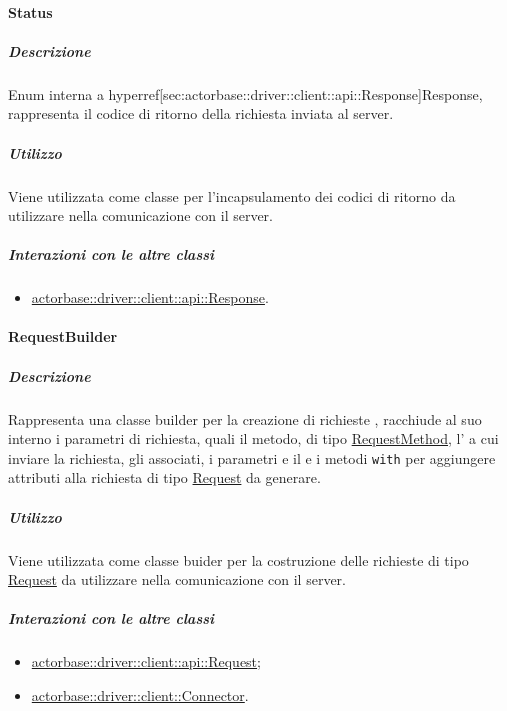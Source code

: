 \documentclass{scalatekids-article}
\begin{document}
\paragraph{Status}
\label{sec:actorbase::driver::client::api::Status}

\subparagraph{Descrizione}

Enum interna a hyperref[sec:actorbase::driver::client::api::Response]{Response},
rappresenta il codice di ritorno della richiesta  inviata al server.

\subparagraph{Utilizzo}

Viene utilizzata come classe per l'incapsulamento dei codici di ritorno
 da utilizzare nella comunicazione con il server.

\subparagraph{Interazioni con le altre classi}

\begin{itemize}
\item \hyperref[sec:actorbase::driver::client::api::Response]{actorbase::driver::client::api::Response}.
\end{itemize}


\paragraph{RequestBuilder}
\label{sec:actorbase::driver::client::api::RequestBuilder}

\subparagraph{Descrizione}

Rappresenta una classe builder per la creazione di richieste ,
racchiude al suo interno i parametri di richiesta, quali il metodo, di tipo
\hyperref[sec:actorbase::driver::client::api::RequestMethod]{RequestMethod},
l' a cui inviare la richiesta, gli  
associati, i parametri e il  e i metodi \verb=with= per
aggiungere attributi alla richiesta di tipo
\hyperref[sec:actorbase::driver::client::api::Request]{Request} da generare.

\subparagraph{Utilizzo}

Viene utilizzata come classe buider per la costruzione delle richieste
 di tipo
\hyperref[sec:actorbase::driver::client::api::Request]{Request} da utilizzare
nella comunicazione con il server.

\subparagraph{Interazioni con le altre classi}

\begin{itemize}
\item \hyperref[sec:actorbase::driver::client::api::Request]{actorbase::driver::client::api::Request};
\item \hyperref[sec:actorbase::driver::client::Connector]{actorbase::driver::client::Connector}.
\end{itemize}
\end{document}
